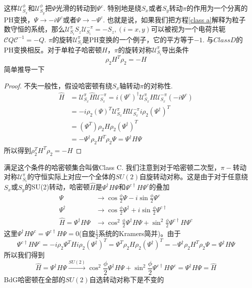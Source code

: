 \documentclass{article}
\numberwithin{equation}{subsection}
\newtheorem{proof}{proof}
\newcommand{\mU}{\mathcal{U}}
\newcommand{\mC}{\mathcal{C}}
\begin{document}
这样$\mU_{S_x}^\phi$和$\mU_{S_y}^\phi$把$\Psi$光滑的转动到$\Psi^c$. 特别地是绕$S_x$或者$S_y$转动$\pi$的作用为一个分离的PH变换，$\Psi\rightarrow-i\Psi^c$或者$\Psi\rightarrow-\Psi^c$. 也就是说，如果我们把方程\eqref{class a}解释为粒子数守恒的系统，那么$\mU_{S_i}^\pi S_z\mU_{S_i}^{-\pi}=-S_z,(i=x,y)$可以被视为一个电荷共轭$\mC Q\mC^{-1}=-Q$. $\pi$的旋转$\mU_{S_i}^\pi$是PH变换的一个例子，它的平方等于$-1$. 与$Class D$的PH变换相反。对于单粒子哈密顿$H$，$\pi$的旋转对称$\mU_{S_i}^\pi$导出条件
\begin{equation}
    \rho_2H^T\rho_2=-H
\end{equation}
简单推导一下
\begin{proof}
    不失一般性，假设哈密顿有绕$S_x$轴转动$\pi$的对称性. 
    \begin{equation}
        \begin{split}
            \hat{H}&=\mU_{S_x}^\pi\hat{H}\mU_{S_x}^{-\pi}=i(\Psi^{c})^\dagger \mU_{S_x}^\pi H\mU_{S_x}^{-\pi}(-i\Psi^c)\\
            &=-i\rho_2(\Psi)^T\mU_{S_x}^\pi H\mU_{S_x}^{-\pi}i\rho_2(\Psi^\dagger)^T\\
            &=(\Psi^T)\rho_2H\rho_2(\Psi^\dagger)^T\\
            &=-\Psi^\dagger \rho_2H^T\rho_2\Psi=\Psi^\dagger H\Psi
        \end{split}
    \end{equation}
    所以得到$\rho_2^TH^T\rho_2=-H$
\end{proof}
满足这个条件的哈密顿集合叫做Class C. 我们注意到对于哈密顿二次型，$\pi-$转动对称$\mU_{S_i}^\pi$的守恒实际上对应一个全体的$SU(2)$自旋转动对称。这是由于对于任意绕$S_x$或$S_y$的SU(2)转动，哈密顿$\hat{H}$是$\Psi^\dagger H\Psi$和$\Psi^{c\dagger}H\Psi^c$的叠加
\begin{equation}
    \begin{split}
        \Psi&\rightarrow\cos\frac{\phi}{2}\Psi-i\sin\frac{\phi}{2}\Psi^c\\
        \Psi^\dagger&\rightarrow\cos\frac{\phi}{2}\Psi^\dagger+i\sin\frac{\phi}{2}\Psi^{c\dagger}\\
        \hat{H}=\Psi^\dagger H\Psi&\rightarrow\cos^2\frac{\phi}{2}\Psi^\dagger H\Psi+\sin^2\frac{\phi}{2}\Psi^{c\dagger}H\Psi^{c}
    \end{split}
\end{equation}
这里$\Psi^\dagger H\Psi^c=\Psi^{c\dagger}H\Psi=0$(自旋$\frac{1}{2}$系统的Kramers简并)。由于
\begin{equation}
    \Psi^{c\dagger}H\Psi^c=-i\rho_2\Psi^THi\rho_2(\Psi^\dagger)^T=\Psi^T\rho_2 H\rho_2(\Psi^\dagger)^T=-\Psi^\dagger\rho_2 H^T\rho_2\Psi=\Psi^\dagger H\Psi
\end{equation}
所以我们得到
\begin{equation}
    \hat{H}=\Psi^\dagger H\Psi\xrightarrow{SU(2)}\cos^2\frac{\phi}{2}\Psi^\dagger H\Psi+\sin^2\frac{\phi}{2}\Psi^{c\dagger}H\Psi^{c}=\Psi^\dagger H\Psi=\hat{H}
\end{equation}
BdG哈密顿在全部的$SU(2)$自选转动对称下是不变的
\end{document}
